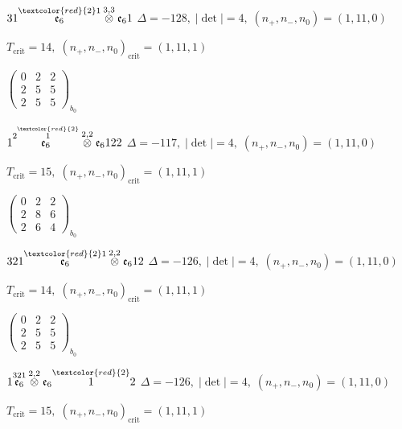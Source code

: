 \documentclass[10pt]{article}
\begin{document}
$31\overset{\textcolor{red}{2}1}{\mathfrak{e}_6}\overset{3,3}{\otimes}\mathfrak{e}_61$ \quad $\Delta=-128,\; |\det|=4,\; (n_+,n_-,n_0)=(1,11,0)$

\hspace{1em}$T_{\text{crit}}=14,\; (n_+,n_-,n_0)_{\text{crit}}=(1,11,1)$

\hspace{2em}$\left(\begin{smallmatrix}0 & 2 & 2 \\ 2 & 5 & 5 \\ 2 & 5 & 5\end{smallmatrix}\right)_{\!b_0}$

\smallskip

$1\overset{2\overset{\textcolor{red}{2}}{1}}{\mathfrak{e}_6}\overset{2,2}{\otimes}\mathfrak{e}_6122$ \quad $\Delta=-117,\; |\det|=4,\; (n_+,n_-,n_0)=(1,11,0)$

\hspace{1em}$T_{\text{crit}}=15,\; (n_+,n_-,n_0)_{\text{crit}}=(1,11,1)$

\hspace{2em}$\left(\begin{smallmatrix}0 & 2 & 2 \\ 2 & 8 & 6 \\ 2 & 6 & 4\end{smallmatrix}\right)_{\!b_0}$

\smallskip

$321\overset{\textcolor{red}{2}1}{\mathfrak{e}_6}\overset{2,2}{\otimes}\mathfrak{e}_612$ \quad $\Delta=-126,\; |\det|=4,\; (n_+,n_-,n_0)=(1,11,0)$

\hspace{1em}$T_{\text{crit}}=14,\; (n_+,n_-,n_0)_{\text{crit}}=(1,11,1)$

\hspace{2em}$\left(\begin{smallmatrix}0 & 2 & 2 \\ 2 & 5 & 5 \\ 2 & 5 & 5\end{smallmatrix}\right)_{\!b_0}$

$1\overset{321}{\mathfrak{e}_6}\overset{2,2}{\otimes}\mathfrak{e}_6\overset{\textcolor{red}{2}}{1}2$ \quad $\Delta=-126,\; |\det|=4,\; (n_+,n_-,n_0)=(1,11,0)$

\hspace{1em}$T_{\text{crit}}=15,\; (n_+,n_-,n_0)_{\text{crit}}=(1,11,1)$
\end{document}

